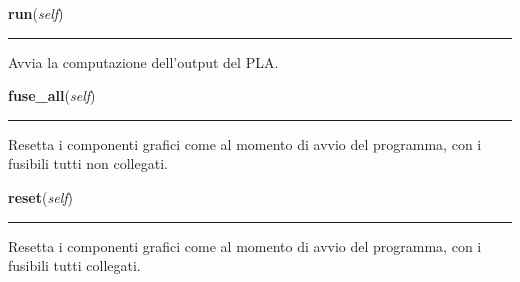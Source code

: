 \hspace{.8\funcindent}\begin{boxedminipage}{\funcwidth}

    \raggedright \textbf{run}(\textit{self})

    \vspace{-1.5ex}

    \rule{\textwidth}{0.5\fboxrule}
\setlength{\parskip}{2ex}
    Avvia la computazione dell'output del PLA.

\setlength{\parskip}{1ex}
    \end{boxedminipage}

    \label{pla:Pla:fuse_all}

    \vspace{0.5ex}

\hspace{.8\funcindent}\begin{boxedminipage}{\funcwidth}

    \raggedright \textbf{fuse\_all}(\textit{self})

    \vspace{-1.5ex}

    \rule{\textwidth}{0.5\fboxrule}
\setlength{\parskip}{2ex}
    Resetta i componenti grafici come al momento di avvio del programma, 
    con i fusibili tutti non collegati.

\setlength{\parskip}{1ex}
    \end{boxedminipage}

    \label{pla:Pla:reset}

    \vspace{0.5ex}

\hspace{.8\funcindent}\begin{boxedminipage}{\funcwidth}

    \raggedright \textbf{reset}(\textit{self})

    \vspace{-1.5ex}

    \rule{\textwidth}{0.5\fboxrule}
\setlength{\parskip}{2ex}
    Resetta i componenti grafici come al momento di avvio del programma, 
    con i fusibili tutti collegati.

\setlength{\parskip}{1ex}
    \end{boxedminipage}

    \label{pla:Pla:load}


